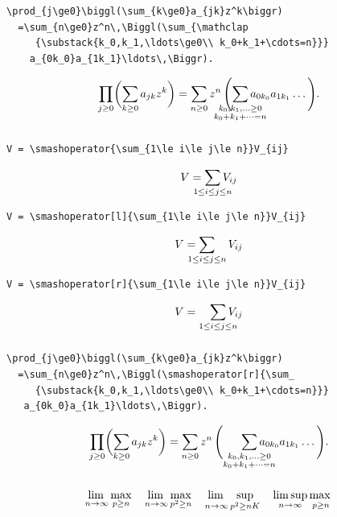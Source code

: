 \documentclass{beamer}
\begin{document}
\begin{frame}[fragile,t]
\frametitle{\texttt{\string\smashoperator}}
\begin{verbatim}
\prod_{j\ge0}\biggl(\sum_{k\ge0}a_{jk}z^k\biggr)
  =\sum_{n\ge0}z^n\,\Biggl(\sum_{\mathclap
     {\substack{k_0,k_1,\ldots\ge0\\ k_0+k_1+\cdots=n}}}
    a_{0k_0}a_{1k_1}\ldots\,\Biggr).
\end{verbatim}
\medskip
\[
\prod_{j\ge0}\biggl(\sum_{k\ge0}a_{jk}z^k\biggr)
  =\sum_{n\ge0}z^n\,\Biggl(\sum_{\mathclap
       {\substack{k_0,k_1,\ldots\ge0\\ k_0+k_1+\cdots=n}}}
    a_{0k_0}a_{1k_1}\ldots\,\Biggr).
\]  
\end{frame}

\begin{frame}[fragile,t]
\frametitle{\texttt{\string\smashoperator}}
\begin{verbatim}
V = \smashoperator{\sum_{1\le i\le j\le n}}V_{ij}
\end{verbatim}
\[V = \smashoperator{\sum_{1\le i\le j\le n}}V_{ij}\]
\smallskip
\begin{verbatim}
V = \smashoperator[l]{\sum_{1\le i\le j\le n}}V_{ij}
\end{verbatim}
\[V = \smashoperator[l]{\sum_{1\le i\le j\le n}}V_{ij}\]
\smallskip
\begin{verbatim}
V = \smashoperator[r]{\sum_{1\le i\le j\le n}}V_{ij}
\end{verbatim}
\[V = \smashoperator[r]{\sum_{1\le i\le j\le n}}V_{ij}\]
\end{frame}

\begin{frame}[fragile,t]
\frametitle{\texttt{\string\smashoperator}}
\begin{verbatim}
\prod_{j\ge0}\biggl(\sum_{k\ge0}a_{jk}z^k\biggr)
  =\sum_{n\ge0}z^n\,\Biggl(\smashoperator[r]{\sum_
     {\substack{k_0,k_1,\ldots\ge0\\ k_0+k_1+\cdots=n}}}
   a_{0k_0}a_{1k_1}\ldots\,\Biggr).
\end{verbatim}
\medskip
\[
\prod_{j\ge0}\biggl(\sum_{k\ge0}a_{jk}z^k\biggr)
  =\sum_{n\ge0}z^n\,\Biggl(\smashoperator[r]{\sum_
       {\substack{k_0,k_1,\ldots\ge0\\ k_0+k_1+\cdots=n}}}
    a_{0k_0}a_{1k_1}\ldots\,\Biggr).
\]    
\end{frame}

\begin{frame}
\frametitle{\texttt{\string\adjustlimits}}
\Large
\[
\adjustlimits\lim_{n\to\infty} \max_{p\ge n} \quad
\adjustlimits\lim_{n\to\infty} \max_{p^2\ge n} \quad
\adjustlimits\lim_{n\to\infty} \sup_{p^2\ge nK} \quad
\adjustlimits\limsup_{n\to\infty} \max_{p\ge n}
\]
\end{frame}
\end{document}
